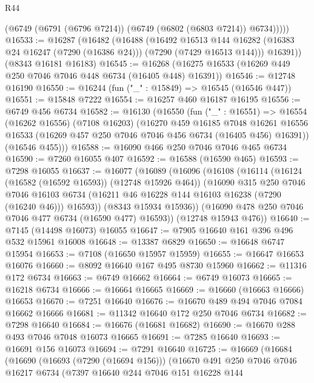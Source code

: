 \begin{lexlean}{R44}
\begin{coremodule}
{          (@6749 (@6791 (@6796 @7214)) (@6749 (@6802 (@6803 @7214)) @6734)))))
@16533 := @16287
    (@16482
      (@16488
        (@16492
          @16513
          @144
          @16282
          (@16383 @24 @16247 (@7290 (@16386 @24)))
          (@7290 (@7429 @16513 @144)))
        @16391))
    (@8343 @16181 @16183)
@16545 := @16268 (@16275 @16533 (@16269 @449 @250 @7046 @7046 @448 @6734 (@16405 @448) @16391))
@16546 := @12748 @16190
@16550 := @16244 (fun ("_" : @15849) => @16545 (@16546 @447))
@16551 := @15848 @7222
@16554 := @16257 @460 @16187 @16195
@16556 := @6749 @456 @6734
@16582 := @16130
    (@16550
      (fun ("_" : @16551) =>
      @16554
        (@16262 @16556)
        (@7108 @16203)
        (@16270
          @459
          @16185
          @7048
          @16261
          @16556
          @16533
          (@16269 @457 @250 @7046 @7046 @456 @6734 (@16405 @456) @16391))
        (@16546 @455)))
@16588 := @16090 @466 @250 @7046 @7046 @465 @6734
@16590 := @7260 @16055 @407
@16592 := @16588 (@16590 @465)
@16593 := @7298 @16055
@16637 := @16077
    (@16089
      (@16096
        (@16108
          (@16114
            (@16124 (@16582 (@16592 @16593)) (@12748 @15926 @464))
            (@16090
              @315
              @250
              @7046
              @7046
              @16103
              @6734
              (@16211 @46 @16228 @144 @16103 @16238 (@7290 (@16240 @46)))
              @16593))
          (@8343 @15934 @15936))
        (@16090 @478 @250 @7046 @7046 @477 @6734 (@16590 @477) @16593))
      (@12748 @15943 @476))
@16640 := @7145 (@14498 @16073) @16055
@16647 := @7905 @16640 @161 @396 @496 @532 @15961 @16008
@16648 := @13387 @6829
@16650 := @16648 @6747 @15954
@16653 := @7108 (@16650 @15957 @15959)
@16655 := @16647 @16653 @16076
@16660 := @8092 @16640 @167 @495 @8730 @15960
@16662 := @11316 @172 @6734
@16663 := @6749 @16662
@16664 := @6749 @16073
@16665 := @16218 @6734
@16666 := @16664 @16665
@16669 := @16660 (@16663 @16666) @16653
@16670 := @7251 @16640
@16676 := @16670 @489 @494 @7046 @7084 @16662 @16666
@16681 := @11342 @16640 @172 @250 @7046 @6734
@16682 := @7298 @16640
@16684 := @16676 (@16681 @16682)
@16690 := @16670 @288 @493 @7046 @7048 @16073 @16665
@16691 := @7285 @16640
@16693 := @16691 @156 @16073
@16694 := @7291 @16640
@16725 := @16669
    (@16684
      (@16690
        (@16693 (@7290 (@16694 @156)))
        (@16670
          @491
          @250
          @7046
          @7046
          @16217
          @6734
          (@7397
            @16640
            @244
            @7046
            @151
            @16228
            @144
}
\end{coremodule}
\end{lexlean}
